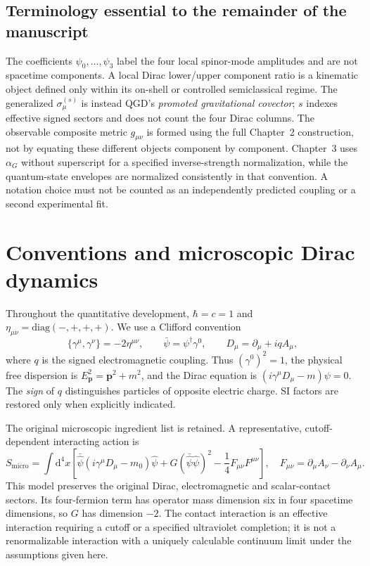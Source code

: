 \documentclass[11pt,a4paper]{article}
\newcommand{\dd}{\mathrm d}
\begin{document}
\subsection*{Terminology essential to the remainder of the manuscript}
The coefficients $\psi_0,\ldots,\psi_3$ label the four local spinor-mode amplitudes and are not spacetime components. A local Dirac lower/upper component ratio is a kinematic object defined only within its on-shell or controlled semiclassical regime. The generalized $\sigma_\mu^{(s)}$ is instead QGD's \emph{promoted gravitational covector}; $s$ indexes effective signed sectors and does not count the four Dirac columns. The observable composite metric $g_{\mu\nu}$ is formed using the full Chapter~2 construction, not by equating these different objects component by component. Chapter~3 uses $\alpha_G$ without superscript for a specified inverse-strength normalization, while the quantum-state envelopes are normalized consistently in that convention. A notation choice must not be counted as an independently predicted coupling or a second experimental fit.

\section{Conventions and microscopic Dirac dynamics}\label{sec:micro}
Throughout the quantitative development, $\hbar=c=1$ and $\eta_{\mu\nu}=\mathrm{diag}(-,+,+,+)$. We use a Clifford convention
\begin{equation}\label{eq:clifford}
\{\gamma^\mu,\gamma^\nu\}=-2\eta^{\mu\nu},\qquad
\bar\psi=\psi^\dagger\gamma^0,\qquad
D_\mu=\partial_\mu+iqA_\mu,
\end{equation}
where $q$ is the signed electromagnetic coupling. Thus $(\gamma^0)^2=1$, the physical free dispersion is $E_{\bm p}^2=\bm p^2+m^2$, and the Dirac equation is $(i\gamma^\mu D_\mu-m)\psi=0$. The \emph{sign} of $q$ distinguishes particles of opposite electric charge. SI factors are restored only when explicitly indicated.

The original microscopic ingredient list is retained. A representative, cutoff-dependent interacting action is
\begin{equation}\label{eq:Smicro}
S_{\mathrm{micro}}=\int\dd^4x\left[
\bar{\hat\psi}(i\gamma^\mu D_\mu-m_0)\hat\psi
+G(\bar{\hat\psi}\hat\psi)^2
-\frac14 F_{\mu\nu}F^{\mu\nu}
\right],\quad F_{\mu\nu}=\partial_\mu A_\nu-\partial_\nu A_\mu.
\end{equation}
This model preserves the original Dirac, electromagnetic and scalar-contact sectors. Its four-fermion term has operator mass dimension six in four spacetime dimensions, so $G$ has dimension $-2$. The contact interaction is an effective interaction requiring a cutoff or a specified ultraviolet completion; it is not a renormalizable interaction with a uniquely calculable continuum limit under the assumptions given here.
\end{document}
